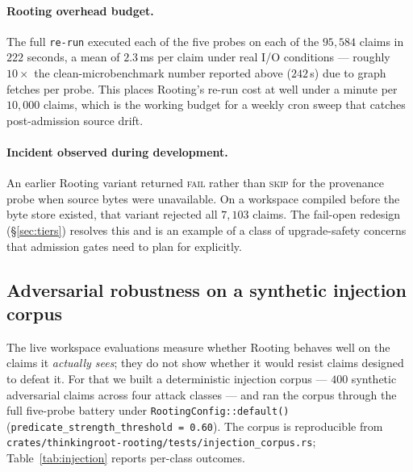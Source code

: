 \documentclass[10pt,a4paper]{article}
\begin{document}
\paragraph{Rooting overhead budget.}
The full \texttt{re-run} executed each of the five probes on each of the
$95{,}584$ claims in $222$ seconds, a mean of $2.3$\,ms per claim under
real I/O conditions --- roughly $10\times$ the clean-microbenchmark
number reported above ($242$\,\textmu s) due to graph fetches per probe.
This places Rooting's re-run cost at well under a minute per
$10{,}000$ claims, which is the working budget for a weekly cron sweep
that catches post-admission source drift.

\paragraph{Incident observed during development.}
An earlier Rooting variant returned \textsc{fail} rather than \textsc{skip}
for the provenance probe when source bytes were unavailable. On a workspace
compiled before the byte store existed, that variant rejected all $7{,}103$
claims. The fail-open redesign (\S\ref{sec:tiers}) resolves this and is an
example of a class of upgrade-safety concerns that admission gates need to
plan for explicitly.

\subsection{Adversarial robustness on a synthetic injection corpus}
\label{sec:eval-injection}

The live workspace evaluations measure whether Rooting behaves well on
the claims it \emph{actually sees}; they do not show whether it would
resist claims designed to defeat it. For that we built a deterministic
injection corpus --- $400$ synthetic adversarial claims across four
attack classes --- and ran the corpus through the full five-probe
battery under \texttt{RootingConfig::default()}
(\texttt{predicate\_strength\_threshold = 0.60}). The corpus is
reproducible from
\texttt{crates/thinkingroot-rooting/tests/injection\_corpus.rs};
Table~\ref{tab:injection} reports per-class outcomes.
\end{document}

